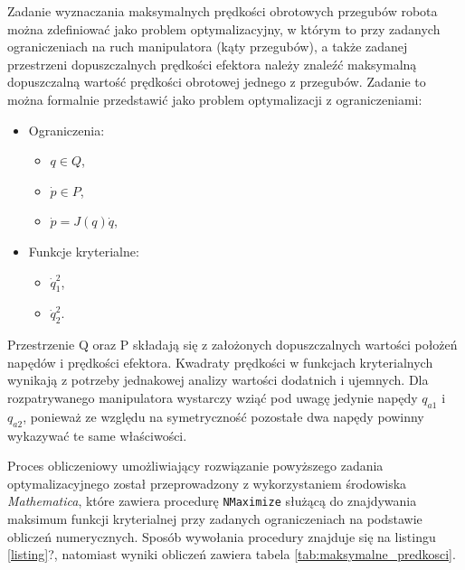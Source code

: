 \documentclass[printmode]{mgr}
\begin{document}
Zadanie wyznaczania maksymalnych prędkości obrotowych przegubów robota można zdefiniować jako problem optymalizacyjny, w którym to
przy zadanych ograniczeniach na ruch manipulatora (kąty przegubów), a także zadanej przestrzeni dopuszczalnych prędkości efektora
należy znaleźć maksymalną dopuszczalną wartość prędkości obrotowej jednego z przegubów. Zadanie to można formalnie przedstawić jako
problem optymalizacji z ograniczeniami:
\begin{itemize}
\item Ograniczenia:
\begin{itemize}
\item $q \in Q$,
\item $\dot{p} \in P$,
\item $\dot{p}=J(q)\dot{q}$,
\end{itemize}
\item Funkcje kryterialne:
\begin{itemize}
\item $\dot{q}^2_1$,
\item $\dot{q}^2_2$.
\end{itemize}
\end{itemize}
Przestrzenie Q oraz P składają się z założonych dopuszczalnych wartości położeń napędów i prędkości efektora. Kwadraty prędkości
w funkcjach kryterialnych wynikają z potrzeby jednakowej analizy wartości dodatnich i ujemnych. Dla rozpatrywanego manipulatora
wystarczy wziąć pod uwagę jedynie napędy $q_{a1}$ i $q_{a2}$, ponieważ ze względu na symetryczność pozostałe dwa napędy
powinny wykazywać te same właściwości.

Proces obliczeniowy umożliwiający rozwiązanie powyższego zadania optymalizacyjnego został przeprowadzony z wykorzystaniem
środowiska \emph{Mathematica}, które zawiera procedurę \texttt{NMaximize} służącą do znajdywania maksimum funkcji
kryterialnej przy zadanych ograniczeniach na podstawie obliczeń numerycznych. Sposób wywołania procedury znajduje się
na listingu \ref{listing}?, natomiast wyniki obliczeń zawiera tabela \ref{tab:maksymalne_predkosci}.
\end{document}
